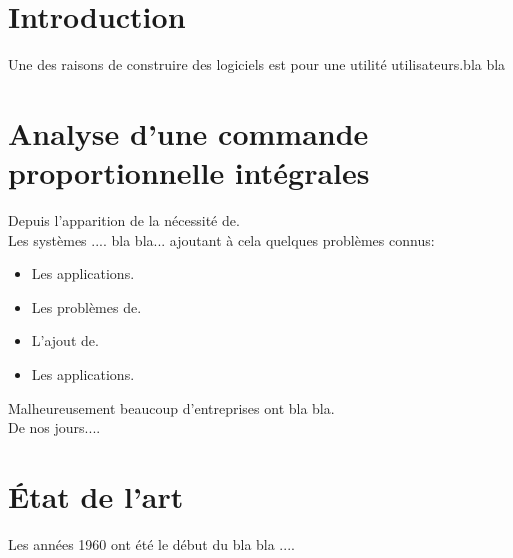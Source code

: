 \documentclass[12pt, a4paper, openany]{report}
\begin{document}
\renewcommand{\contentsname}{Sommaire}
\tableofcontents
\listoffigures
\listoftables



\chapter{Introduction}
 
  Une des raisons de construire des logiciels est pour une utilité utilisateurs.bla bla
                                                      



\chapter{ Analyse d'une commande proportionnelle intégrales}
   Depuis l’apparition de la nécessité de. \\
   
   Les systèmes .... bla bla... ajoutant à cela quelques problèmes connus:
   
    \begin{itemize}[label=$\square$]
      \item  Les applications.
      \item  Les problèmes de. 
      \item  L'ajout de.
      \item  Les applications.
  \end{itemize}
  
   Malheureusement beaucoup d'entreprises ont bla bla. \\
   
   De nos jours....
   
   



\chapter*{État de l'art}

 Les années 1960 ont été le début du bla bla .... \\
 
\end{document}
